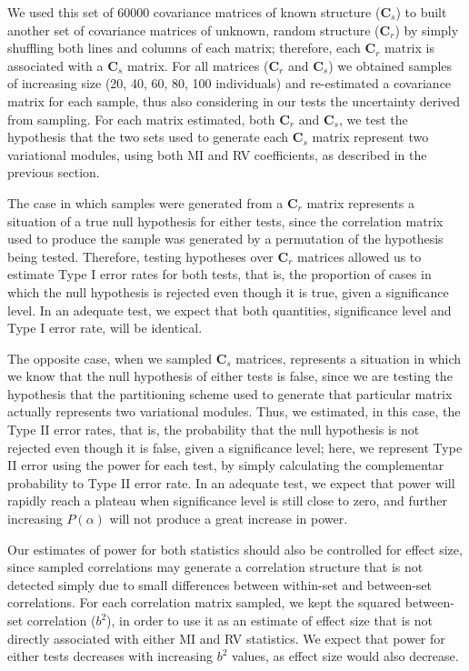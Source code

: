 \documentclass[12pt,]{article}
\begin{document}
We used this set of 60000 covariance matrices of known structure
($\mathbf{C}_s$) to built another set of covariance matrices of unknown,
random structure ($\mathbf{C}_r$) by simply shuffling both lines and
columns of each matrix; therefore, each $\mathbf{C}_r$ matrix is
associated with a $\mathbf{C}_s$ matrix. For all matrices
($\mathbf{C}_r$ and $\mathbf{C}_s$) we obtained samples of increasing
size (20, 40, 60, 80, 100 individuals) and re-estimated a covariance
matrix for each sample, thus also considering in our tests the
uncertainty derived from sampling. For each matrix estimated, both
$\mathbf{C}_r$ and $\mathbf{C}_s$, we test the hypothesis that the two
sets used to generate each $\mathbf{C}_s$ matrix represent two
variational modules, using both MI and RV coefficients, as described in
the previous section.

The case in which samples were generated from a $\mathbf{C}_r$ matrix
represents a situation of a true null hypothesis for either tests, since
the correlation matrix used to produce the sample was generated by a
permutation of the hypothesis being tested. Therefore, testing
hypotheses over $\mathbf{C}_r$ matrices allowed us to estimate Type I
error rates for both tests, that is, the proportion of cases in which
the null hypothesis is rejected even though it is true, given a
significance level. In an adequate test, we expect that both quantities,
significance level and Type I error rate, will be identical.

The opposite case, when we sampled $\mathbf{C}_s$ matrices, represents a
situation in which we know that the null hypothesis of either tests is
false, since we are testing the hypothesis that the partitioning scheme
used to generate that particular matrix actually represents two
variational modules. Thus, we estimated, in this case, the Type II error
rates, that is, the probability that the null hypothesis is not rejected
even though it is false, given a significance level; here, we represent
Type II error using the power for each test, by simply calculating the
complementar probability to Type II error rate. In an adequate test, we
expect that power will rapidly reach a plateau when significance level
is still close to zero, and further increasing $P(\alpha)$ will not
produce a great increase in power.

Our estimates of power for both statistics should also be controlled for
effect size, since sampled correlations may generate a correlation
structure that is not detected simply due to small differences between
within-set and between-set correlations. For each correlation matrix
sampled, we kept the squared between-set correlation ($b^2$), in order
to use it as an estimate of effect size that is not directly associated
with either MI and RV statistics. We expect that power for either tests
decreases with increasing $b^2$ values, as effect size would also
decrease.
\end{document}
